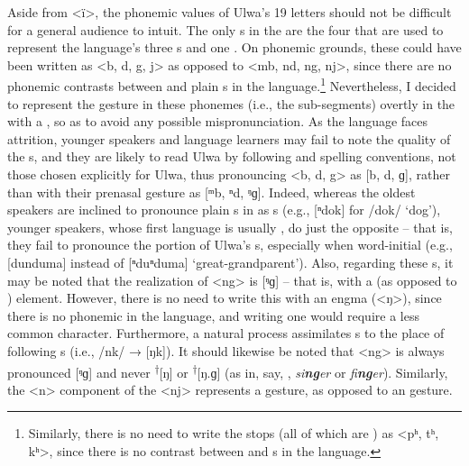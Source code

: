   Aside from <ï>, the phonemic values of Ulwa’s 19 letters should not be difficult for a general audience to intuit. The only s in the  are the four that are used to represent the language’s three   s and one   . On phonemic grounds, these could have been written as <b, d, g, j> as opposed to <mb, nd, ng, nj>, since there are no phonemic contrasts between  and plain  s in the language.\footnote{Similarly, there is no need to write the  stops (all of which are ) as <pʰ, tʰ, kʰ>, since there is no contrast between  and   s in the language.} Nevertheless, I decided to represent the  gesture in these phonemes (i.e., the  sub-segments) overtly in the  with a , so as to avoid any possible mispronunciation. As the language faces attrition, younger speakers and language learners may fail to note the  quality of the  s, and they are likely to read Ulwa by following  and  spelling conventions, not those chosen explicitly for Ulwa, thus pronouncing <b, d, g> as [b, d, ɡ], rather than with their prenasal gesture as [ᵐb, ⁿd, ᵑɡ]. Indeed, whereas the oldest speakers are inclined to pronounce plain  s in  as   s (e.g., [ⁿdok] for  /dok/ ‘dog’), younger speakers, whose first language is usually , do just the opposite -- that is, they fail to pronounce the  portion of Ulwa’s  s, especially when word-initial (e.g., [dunduma] instead of [ⁿduⁿduma] ‘great-grandparent’). Also, regarding these s, it may be noted that the  realization of <ng> is [ᵑɡ] -- that is, with a    (as opposed to )  element. However, there is no need to write this  with an engma (<ŋ>), since there is no phonemic   in the language, and writing one would require a less common character. Furthermore, a natural  process   assimilates  s to the place of following  s (i.e., /nk/ → [ŋk]). It should likewise be noted that <ng> is always pronounced [ᵑɡ] and never \textsuperscript{†}[ŋ] or \textsuperscript{†}[ŋ.ɡ] (as in, say, , \textit{si}\textbf{\textit{ng}}\textit{er} or \textit{fi}\textbf{\textit{ng}}\textit{er}). Similarly, the <n> component of the  <nj> represents a   gesture, as opposed to an   gesture.

